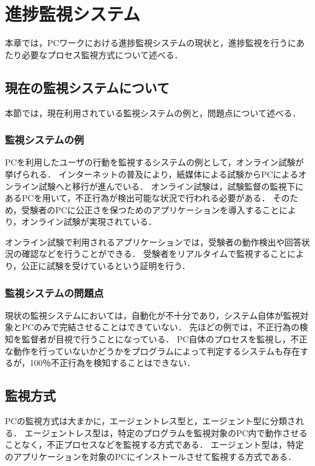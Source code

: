 \chapter{進捗監視システム}

本章では，PCワークにおける進捗監視システムの現状と，進捗監視を行うにあたり必要なプロセス監視方式について述べる．

\section{現在の監視システムについて}

本節では，現在利用されている監視システムの例と，問題点について述べる．

\subsection{監視システムの例}
PCを利用したユーザの行動を監視するシステムの例として，オンライン試験が挙げられる\cite{Hari2006}．
インターネットの普及により，紙媒体による試験からPCによるオンライン試験へと移行が進んでいる．
オンライン試験は，試験監督の監視下にあるPCを用いて，不正行為が検出可能な状況で行われる必要がある．
そのため，受験者のPCに公正さを保つためのアプリケーションを導入することにより，オンライン試験が実現されている．

オンライン試験で利用されるアプリケーションでは，受験者の動作検出や回答状況の確認などを行うことができる．
受験者をリアルタイムで監視することにより，公正に試験を受けているという証明を行う．

\subsection{監視システムの問題点}
現状の監視システムにおいては，自動化が不十分であり，システム自体が監視対象とPCのみで完結させることはできていない．
先ほどの例では，不正行為の検知を監督者が目視で行うことになっている．
PC自体のプロセスを監視し，不正な動作を行っていないかどうかをプログラムによって判定するシステムも存在するが，100％不正行為を検知することはできない．

\section{監視方式}
PCの監視方式は大まかに，エージェントレス型と，エージェント型に分類される\cite{Hari2006}．
エージェントレス型は，特定のプログラムを監視対象のPC内で動作させることなく，不正プロセスなどを監視する方式である．
エージェント型は，特定のアプリケーションを対象のPCにインストールさせて監視する方式である．

